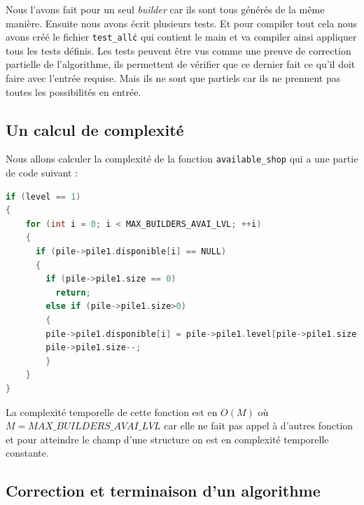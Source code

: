 \documentclass{article}
\begin{document}
\vspace{1cm} Nous l'avons fait pour un seul \emph{builder} car ils sont tous générés de la même manière. Ensuite nous avons écrit plusieurs tests. Et pour compiler tout cela nous avons créé le fichier \texttt{test\_all\.c} qui contient le main et va compiler ainsi appliquer tous les tests définis. Les tests peuvent être vus comme une preuve de correction partielle de l'algorithme, ils permettent de vérifier que ce dernier fait ce qu'il doit faire avec l'entrée requise. Mais ils ne sont que partiels car ils ne prennent pas toutes les possibilités en entrée. 
\newpage

\subsection{Un calcul de complexité} 
\hspace{1em} Nous allons calculer la complexité de la fonction \texttt{available\_shop} qui a une partie de code suivant :


\begin{tcolorbox}[colback=gray!10,colframe=white!75!black]
\begin{lstlisting}[language=C, caption={Partie available\_builder},label={lst:exemple12-c}]
if (level == 1)
{
    for (int i = 0; i < MAX_BUILDERS_AVAI_LVL; ++i)
    {
      if (pile->pile1.disponible[i] == NULL)
      {
        if (pile->pile1.size == 0)
          return;
        else if (pile->pile1.size>0)
        {
        pile->pile1.disponible[i] = pile->pile1.level[pile->pile1.size - 1];
        pile->pile1.size--;
        }
    }
}
\end{lstlisting}
\end{tcolorbox}

La complexité temporelle de cette fonction est en $O(M)$ où $M=MAX\_BUILDERS\_AVAI\_LVL$ car elle ne fait pas appel à d'autres fonction et pour atteindre le champ d'une structure on est en complexité temporelle constante. 



\subsection{Correction et terminaison d'un algorithme}
\end{document}
